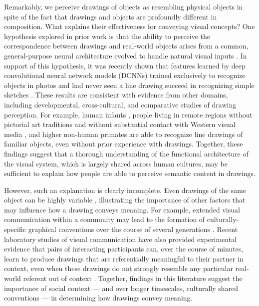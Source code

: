 \documentclass[9pt,twocolumn,twoside]{pnas-new}
\begin{document}
Remarkably, we perceive drawings of objects as resembling physical objects in spite of the fact that drawings and objects are profoundly different in composition. 
What explains their effectiveness for conveying visual concepts? 
One hypothesis explored in prior work is that the ability to perceive the correspondence between drawings and real-world objects arises from a common, general-purpose neural architecture evolved to handle natural visual inputs \cite{Sayim:2011bz,gibson2014ecological}. 
In support of this hypothesis, it was recently shown that features learned by deep convolutional neural network models (DCNNs) trained exclusively to recognize objects in photos and had never seen a line drawing succeed in recognizing simple sketches \cite{FanCommon2018,yamins2014performance}. 
These results are consistent with evidence from other domains, including developmental, cross-cultural, and comparative studies of drawing perception. 
For example, human infants \cite{hochberg1962pictorial}, people living in remote regions without pictorial art traditions and without substantial contact with Western visual media \cite{kennedy1975outline}, and higher non-human primates \cite{tanaka2007recognition} are able to recognize line drawings of familiar objects, even without prior experience with drawings. 
Together, these findings suggest that a thorough understanding of the functional architecture of the visual system, which is largely shared across human cultures, may be sufficient to explain how people are able to perceive semantic content in drawings.

However, such an explanation is clearly incomplete. 
Even drawings of the same object can be highly variable \cite{quickdraw2017}, illustrating the importance of other factors that may influence how a drawing conveys meaning. 
For example, extended visual communication within a community may lead to the formation of culturally-specific graphical conventions over the course of several generations \cite{toku2001cross,boltz1994origin}. 
Recent laboratory studies of visual communication have also provided experimental evidence that pairs of interacting participants can, over the course of minutes, learn to produce drawings that are referentially meaningful to their partner in context, even when these drawings do not strongly resemble any particular real-world referent out of context \cite{Garrod:2007wk,fay2010interactive,Galantucci:2005uh,Healey:2007vq}. 
Together, findings in this literature suggest the importance of social context --- and over longer timescales, culturally shared conventions --- in determining how drawings convey meaning.
\end{document}
